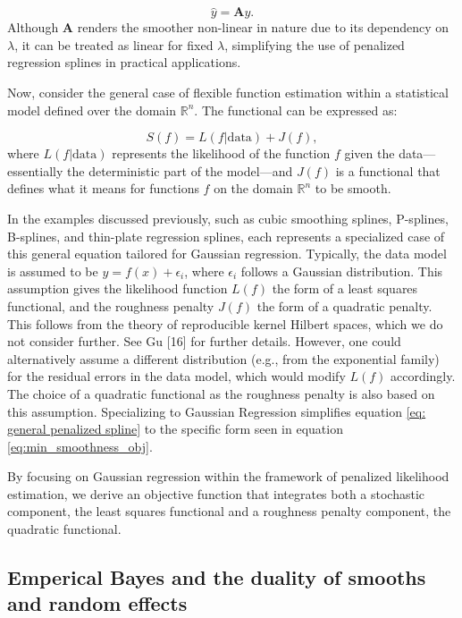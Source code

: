 \documentclass[
11pt, %
oneside, %
english, %
singlespacing, %
]{macthesis} %
\begin{document}
\[
\hat{y} = \mathbf{A}y.
\]
Although \(\mathbf{A}\) renders the smoother non-linear in nature due to its dependency on \(\lambda\), it can be treated as linear for fixed \(\lambda\), simplifying the use of penalized regression splines in practical applications.

Now, consider the general case of flexible function estimation within a statistical model defined over the domain \(\mathbb{R}^n\). The functional can be expressed as:

\begin{equation}
S(f) = L(f | \text{data}) + J(f),
\label{eq: general penalized spline}
\end{equation}
where \(L(f | \text{data})\) represents the likelihood of the function \(f\) given the data---essentially the deterministic part of the model---and \(J(f)\) is a functional that defines what it means for functions \(f\) on the domain \(\mathbb{R}^n\) to be smooth.

In the examples discussed previously, such as cubic smoothing splines, P-splines, B-splines, and thin-plate regression splines, each represents a specialized case of this general equation tailored for Gaussian regression. Typically, the data model is assumed to be \(y = f(x) + \epsilon_i\), where \(\epsilon_i\) follows a Gaussian distribution. This assumption gives the likelihood function \(L(f)\) the form of a least squares functional, and the roughness penalty \(J(f)\) the form of a quadratic penalty. This follows from the theory of reproducible kernel Hilbert spaces, which we do not consider further. See Gu {[}16{]} for further details. However, one could alternatively assume a different distribution (e.g., from the exponential family) for the residual errors in the data model, which would modify \(L(f)\) accordingly. The choice of a quadratic functional as the roughness penalty is also based on this assumption. Specializing to Gaussian Regression simplifies equation \ref{eq: general penalized spline} to the specific form seen in equation \ref{eq:min_smoothness_obj}.

By focusing on Gaussian regression within the framework of penalized likelihood estimation, we derive an objective function that integrates both a stochastic component, the least squares functional and a roughness penalty component, the quadratic functional.

\subsection{Emperical Bayes and the duality of smooths and random effects}\label{The-duality-of-smooths-and-random-effects}
\end{document}
